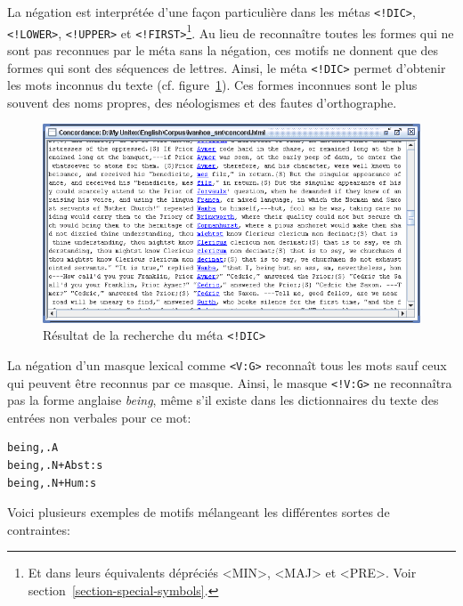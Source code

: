 \bigskip
\noindent La négation est interprétée d’une façon particulière dans les métas 
\verb+<!DIC>+, \verb+<!LOWER>+, \verb+<!UPPER>+ et
\verb+<!FIRST>+\footnote{Et dans leurs équivalents dépréciés <MIN>, <MAJ> et
<PRE>. Voir section~\ref{section-special-symbols}.}.
Au lieu de reconnaître toutes les formes qui ne sont pas reconnues
par le méta sans la négation, ces motifs ne donnent que des formes qui sont des séquences
de lettres. Ainsi, le méta \verb+<!DIC>+ permet d’obtenir les mots inconnus du texte (cf.
  figure~\ref{fig-search-<!DIC>}). Ces formes
inconnues sont le plus souvent des noms propres, des néologismes et des fautes d’orthographe.

\bigskip
\begin{figure}[!ht]
\begin{center}
\includegraphics[width=15cm]{resources/img/fig4-1.png}
\caption{Résultat de la recherche du méta \texttt{<!DIC>}\label{fig-search-<!DIC>}}
\end{center}
\end{figure}

\bigskip
\noindent La négation d’un masque lexical comme  \verb+<V:G>+ reconnaît tous les mots sauf ceux qui
peuvent être reconnus par ce masque. Ainsi, le masque \verb+<!V:G>+ ne reconnaîtra pas la forme
anglaise \emph{being}, même s’il existe dans les dictionnaires du texte des entrées non verbales pour ce
mot:

\begin{verbatim}
being,.A
being,.N+Abst:s
being,.N+Hum:s
\end{verbatim}

\noindent Voici plusieurs exemples de motifs mélangeant les différentes sortes de contraintes:

